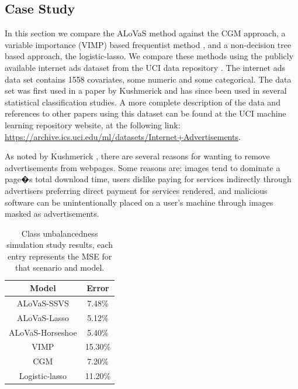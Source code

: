 \subsection{Case Study}\label{sec:real_data}

In this section we compare the ALoVaS method against the CGM approach, a variable importance (VIMP) based frequentist method \cite{ishwaran2010high}, and a non-decision tree based approach, the logistic-lasso. We compare these methods using the publicly available internet ads dataset from the UCI data repository \cite{Frank:2010uq}. The internet ads data set contains 1558 covariates, some numeric and some categorical. The data set was first used in a paper by Kushmerick \cite{kushmerick1999learning} and has since been used in several statistical classification studies. A more complete description of the data and references to other papers using this dataset can be found at the UCI machine learning repository website, at the following link: \url{https://archive.ics.uci.edu/ml/datasets/Internet+Advertisements}.

As noted by Kushmerick \cite{kushmerick1999learning}, there are several reasons for wanting to remove advertisements from webpages. Some reasons are: images tend to dominate a page�s total download time, users dislike paying for services indirectly through advertisers preferring direct payment for services rendered, and malicious software can be unintentionally placed on a user's machine through images masked as advertisements. 

		\begin{table}[H]
\begin{center}
\begin{tabular}{|c|c|} \hline
Model & Error \\ \hline
ALoVaS-SSVS&7.48\%\\ \hline
ALoVaS-Lasso &5.12\% \\ \hline
ALoVaS-Horseshoe&5.40\% \\ \hline
VIMP& 15.30\%\\ \hline
CGM&7.20\%\\ \hline
Logistic-lasso&11.20\%\\ \hline
\end{tabular}
\caption{Class unbalancedness simulation study results, each entry represents the MSE for that scenario and model. }
\label{tab:ads_misclass}
\end{center}
\end{table}


